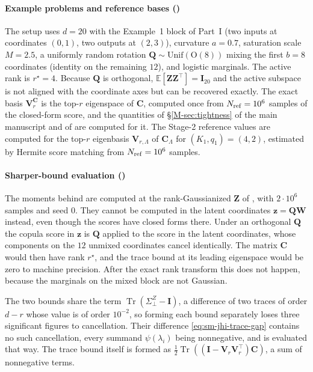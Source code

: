 \documentclass[supplement,review,hidelinks,onefignum,onetabnum]{siamart251216}
\newcommand{\EE}{\mathbb{E}}
\newcommand{\tr}{\operatorname{Tr}}
\newcommand{\mC}{\bm{C}}
\newcommand{\mV}{\bm{V}}
\newcommand{\mI}{\bm{I}}
\newcommand{\mQ}{\bm{Q}}
\newcommand{\vz}{\bm{z}}
\newcommand{\vZ}{\bm{Z}}
\newcommand{\vW}{\bm{W}}
\begin{document}
\paragraph{Example problems and reference bases ()} The setup uses $d = 20$ with the Example~1 block of Part~I \cite{CAS_partI} (two inputs at coordinates $(0, 1)$, two outputs at $(2, 3)$), curvature $a = 0.7$, saturation scale $M = 2.5$, a uniformly random rotation $\mQ \sim \mathrm{Unif}(\mathrm{O}(8))$ mixing the first $b=8$ coordinates (identity on the remaining $12$), and logistic marginals. The active rank is $r^\star = 4$. Because $\mQ$ is orthogonal, $\EE[\vZ\vZ^\top] = \mI_{20}$ and the active subspace is not aligned with the coordinate axes but can be recovered exactly. The exact basis $\mV_r^{\mC}$ is the top-$r$ eigenspace of $\mC$, computed once from $N_{\rm ref} = 10^6$ samples of the closed-form score, and the quantities of \S\ref{M-sec:tightness} of the main manuscript and of  are computed for it. The Stage-2 reference values are computed for the top-$r$ eigenbasis $\mV_{r,\Lambda}$ of $\mC_\Lambda$ for $(K_1, q_1) = (4,2)$, estimated by Hermite score matching from $N_{\rm ref} = 10^6$ samples.

\paragraph{Sharper-bound evaluation ()} The moments behind  are computed at the rank-Gaussianized $\vZ$ of , with $2\cdot10^6$ samples and seed $0$. They cannot be computed in the latent coordinates $\vz = \mQ\vW$ instead, even though the scores have closed forms there. Under an orthogonal $\mQ$ the copula score in $\vz$ is $\mQ$ applied to the score in the latent coordinates, whose components on the $12$ unmixed coordinates cancel identically. The matrix $\mC$ would then have rank $r^\star$, and the trace bound at its leading eigenspace would be zero to machine precision. After the exact rank transform this does not happen, because the marginals on the mixed block are not Gaussian.

The two bounds share the term $\tr(\Sigma^Z_\perp - \mI)$, a difference of two traces of order $d-r$ whose value is of order $10^{-2}$, so forming each bound separately loses three significant figures to cancellation. Their difference \eqref{eq:sm-jhi-trace-gap} contains no such cancellation, every summand $\psi(\lambda_i)$ being nonnegative, and is evaluated that way. The trace bound itself is formed as $\tfrac12\tr((\mI-\mV_r\mV_r^\top)\mC)$, a sum of nonnegative terms.
\end{document}
